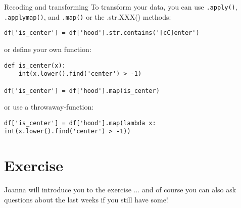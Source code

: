 \documentclass{beamer}
\begin{document}
\begin{frame}[fragile]{Recoding and transforming}
To transform your data, you can use \texttt{.apply()}, \texttt{.applymap()}, and \texttt{.map()} or the .str.XXX() methods:

\begin{lstlisting}
df['is_center'] = df['hood'].str.contains('[cC]enter')
\end{lstlisting}
or define your own function:
\begin{lstlisting}
def is_center(x):
    int(x.lower().find('center') > -1)
    
df['is_center'] = df['hood'].map(is_center)
\end{lstlisting}
or use a throwaway-function:
\begin{lstlisting}
df['is_center'] = df['hood'].map(lambda x: int(x.lower().find('center') > -1))
\end{lstlisting}


\end{frame}




\section{Exercise}
\begin{frame}[plain]
{\huge{Joanna will introduce you to the exercise} }
\vskip 1cm
... and of course you can also ask questions about the last weeks if you still have some!
\end{frame}
\end{document}
